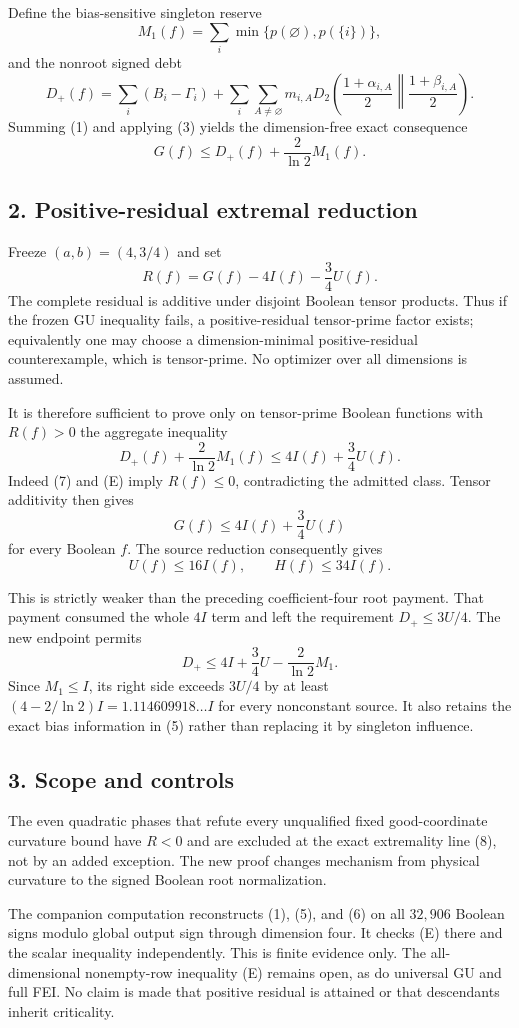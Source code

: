 Define the bias-sensitive singleton reserve
\[
 M_1(f)=\sum_i\min\{p(\varnothing),p(\{i\})\},             \tag{5}
\]
and the nonroot signed debt
\[
 D_+(f)=\sum_i(B_i-\Gamma_i)+
 \sum_i\sum_{A\ne\varnothing}m_{i,A}D_2\left(
 \frac{1+\alpha_{i,A}}2\middle\|\frac{1+\beta_{i,A}}2
 \right).                                                \tag{6}
\]
Summing (1) and applying (3) yields the dimension-free exact consequence
\[
 \boxed{G(f)\le D_+(f)+\frac{2}{\ln2}M_1(f).}              \tag{7}
\]

\subsection*{2. Positive-residual extremal reduction}

Freeze $(a,b)=(4,3/4)$ and set
\[
 R(f)=G(f)-4I(f)-\frac34U(f).                              \tag{8}
\]
The complete residual is additive under disjoint Boolean tensor products.
Thus if the frozen GU inequality fails, a positive-residual tensor-prime
factor exists; equivalently one may choose a dimension-minimal
positive-residual counterexample, which is tensor-prime.  No optimizer over
all dimensions is assumed.

It is therefore sufficient to prove only on tensor-prime Boolean functions
with $R(f)>0$ the aggregate inequality
\[
 \boxed{
 D_+(f)+\frac{2}{\ln2}M_1(f)
 \le4I(f)+\frac34U(f).
 }                                                        \tag{E}
\]
Indeed (7) and (E) imply $R(f)\le0$, contradicting the admitted class.
Tensor additivity then gives
\[
 G(f)\le4I(f)+\frac34U(f)                                 \tag{9}
\]
for every Boolean $f$.  The source reduction consequently gives
\[
 U(f)\le16I(f),\qquad H(f)\le34I(f).                      \tag{10}
\]

This is strictly weaker than the preceding coefficient-four root payment.
That payment consumed the whole $4I$ term and left the requirement
$D_+\le3U/4$.  The new endpoint permits
\[
 D_+\le4I+\frac34U-\frac{2}{\ln2}M_1.                    \tag{11}
\]
Since $M_1\le I$, its right side exceeds $3U/4$ by at least
$(4-2/\ln2)I=1.114609918\ldots I$ for every nonconstant source.
It also retains the exact bias information in (5) rather than replacing it
by singleton influence.

\subsection*{3. Scope and controls}

The even quadratic phases that refute every unqualified fixed
good-coordinate curvature bound have $R<0$ and are excluded at the exact
extremality line (8), not by an added exception.  The new proof changes
mechanism from physical curvature to the signed Boolean root normalization.

The companion computation reconstructs (1), (5), and (6) on all $32,906$
Boolean signs modulo global output sign through dimension four.  It checks
(E) there and the scalar inequality independently.  This is finite evidence
only.  The all-dimensional nonempty-row inequality (E) remains open, as do
universal GU and full FEI.  No claim is made that positive residual is
attained or that descendants inherit criticality.
